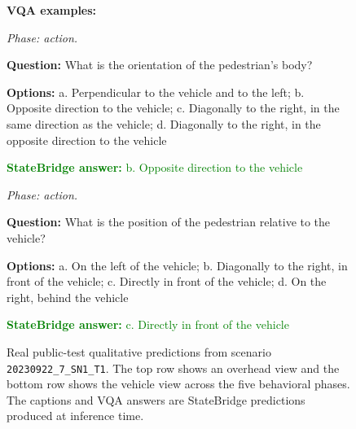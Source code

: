 \documentclass[runningheads]{llncs}
\begin{document}
\begin{figure}[h!]
    \par\vspace{0.35em}
    \noindent\textbf{VQA examples:}
    \par\vspace{0.15em}
    \noindent
    \begin{minipage}[t]{0.485\textwidth}
\textit{Phase: action.}\par
\textbf{Question:} What is the orientation of the pedestrian's body?\par
\textbf{Options:} a. Perpendicular to the vehicle and to the left; b. Opposite direction to the vehicle; c. Diagonally to the right, in the same direction as the vehicle; d. Diagonally to the right, in the opposite direction to the vehicle\par
\textcolor{green}{\textbf{StateBridge answer:} b. Opposite direction to the vehicle}
\end{minipage}\hfill
\begin{minipage}[t]{0.485\textwidth}
\textit{Phase: action.}\par
\textbf{Question:} What is the position of the pedestrian relative to the vehicle?\par
\textbf{Options:} a. On the left of the vehicle; b. Diagonally to the right, in front of the vehicle; c. Directly in front of the vehicle; d. On the right, behind the vehicle\par
\textcolor{green}{\textbf{StateBridge answer:} c. Directly in front of the vehicle}
\end{minipage}

    \endgroup

    \caption{Real public-test qualitative predictions from scenario \texttt{20230922\_7\_SN1\_T1}. The top row shows an overhead view and the bottom row shows the vehicle view across the five behavioral phases. The captions and VQA answers are StateBridge predictions produced at inference time.}
    \label{fig:real_test_qualitative}
\end{figure}
\end{document}
